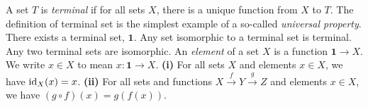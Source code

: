  A set $T$ is \textit{terminal} if for all sets $X$, there is a unique function from $X$ to $T$. The definition of terminal set is the simplest example of a so-called \textit{universal property}.
 There exists a terminal set, $\mathbf{1}$.
 Any set isomorphic to a terminal set is terminal.
 Any two terminal sets are isomorphic.
 An \textit{element} of a set $X$ is a function $\mathbf{1} \to X$. We write $x \in X$ to mean $x \colon \mathbf{1} \to X$.
 \textbf{(i)} For all sets $X$ and elements $x \in X$, we have $\operatorname{id}_X(x) = x$. \textbf{(ii)} For all sets and functions $X \xrightarrow{f} Y \xrightarrow{g} Z$ and elements $x \in X$, we have $(g \circ f)(x) = g(f(x))$.

